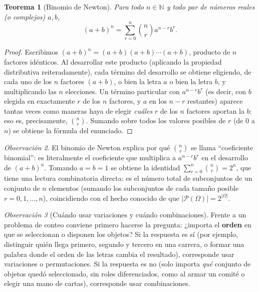 \documentclass[11pt,a4paper]{article}
\theoremstyle{plain}
\newtheorem{teorema}{Teorema}[section]
\theoremstyle{definition}
\theoremstyle{remark}
\newtheorem{observacion}[teorema]{Observación}
\begin{document}
\begin{teorema}[Binomio de Newton]
Para todo $n \in \mathbb{N}$ y todo par de números reales (o complejos) $a,b$,
\[
(a+b)^n = \sum_{r=0}^{n} \binom{n}{r} a^{n-r} b^r.
\]
\end{teorema}

\begin{proof}
Escribimos $(a+b)^n = (a+b)(a+b)\cdots(a+b)$, producto de $n$ factores idénticos. Al desarrollar este producto (aplicando la propiedad distributiva reiteradamente), cada término del desarrollo se obtiene eligiendo, de cada uno de los $n$ factores $(a+b)$, o bien la letra $a$ o bien la letra $b$, y multiplicando las $n$ elecciones. Un término particular con $a^{n-r}b^r$ (es decir, con $b$ elegida en exactamente $r$ de los $n$ factores, y $a$ en los $n-r$ restantes) aparece tantas veces como maneras haya de elegir \emph{cuáles} $r$ de los $n$ factores aportan la $b$: eso es, precisamente, $\binom{n}{r}$. Sumando sobre todos los valores posibles de $r$ (de $0$ a $n$) se obtiene la fórmula del enunciado.
\end{proof}

\begin{observacion}
El binomio de Newton explica por qué $\binom{n}{r}$ se llama ``coeficiente binomial'': es literalmente el coeficiente que multiplica a $a^{n-r}b^r$ en el desarrollo de $(a+b)^n$. Tomando $a=b=1$ se obtiene la identidad $\sum_{r=0}^n \binom{n}{r} = 2^n$, que tiene una lectura combinatoria directa: es el número total de subconjuntos de un conjunto de $n$ elementos (sumando los subconjuntos de cada tamaño posible $r=0,1,\dots,n$), coincidiendo con el hecho conocido de que $|\mathcal{P}(\Omega)|=2^{|\Omega|}$.
\end{observacion}

\begin{observacion}[Cuándo usar variaciones y cuándo combinaciones]
Frente a un problema de conteo conviene primero hacerse la pregunta: ¿importa el \textbf{orden} en que se seleccionan o disponen los objetos? Si la respuesta es sí (por ejemplo, distinguir quién llega primero, segundo y tercero en una carrera, o formar una palabra donde el orden de las letras cambia el resultado), corresponde usar variaciones o permutaciones. Si la respuesta es no (solo importa \emph{qué} conjunto de objetos quedó seleccionado, sin roles diferenciados, como al armar un comité o elegir una mano de cartas), corresponde usar combinaciones.
\end{observacion}
\end{document}
